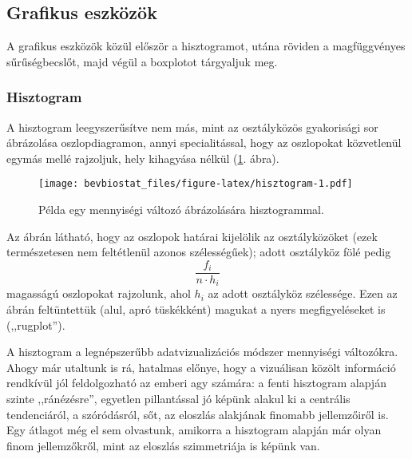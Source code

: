 \documentclass[]{book}
\newenvironment{Shaded}{\begin{snugshade}}{\end{snugshade}}
\newcommand{\KeywordTok}[1]{\textcolor[rgb]{0.13,0.29,0.53}{\textbf{#1}}}
\newcommand{\DataTypeTok}[1]{\textcolor[rgb]{0.13,0.29,0.53}{#1}}
\newcommand{\StringTok}[1]{\textcolor[rgb]{0.31,0.60,0.02}{#1}}
\newcommand{\OperatorTok}[1]{\textcolor[rgb]{0.81,0.36,0.00}{\textbf{#1}}}
\newcommand{\NormalTok}[1]{#1}
\begin{document}
\subsection{Grafikus eszközök}\label{deskriptivmennyegyvaltgrafikus}

A grafikus eszközök közül először a hisztogramot, utána röviden a
magfüggvényes sűrűségbecslőt, majd végül a boxplotot tárgyaljuk meg.

\subsubsection{Hisztogram}\label{deskriptivmennyegyvaltgrafikushisztogram}

A hisztogram leegyszerűsítve nem más, mint az osztályközös gyakorisági
sor ábrázolása oszlopdiagramon, annyi specialitással, hogy az oszlopokat
közvetlenül egymás mellé rajzoljuk, hely kihagyása nélkül
(\ref{fig:hisztogram}. ábra).

\begin{Shaded}
\end{Shaded}

\begin{figure}
\centering
\texttt{[image: bevbiostat\_files/figure-latex/hisztogram-1.pdf]}
\caption{\label{fig:hisztogram}Példa egy mennyiségi változó ábrázolására
hisztogrammal.}
\end{figure}

Az ábrán látható, hogy az oszlopok határai kijelölik az osztályközöket
(ezek természetesen nem feltétlenül azonos szélességűek); adott
osztályköz fölé pedig \[
    \frac{f_i}{n \cdot h_i}
\] magasságú oszlopokat rajzolunk, ahol \(h_i\) az adott osztályköz
szélessége. Ezen az ábrán feltüntettük (alul, apró tüskékként) magukat a
nyers megfigyeléseket is (,,rugplot'').

A hisztogram a legnépszerűbb adatvizualizációs módszer mennyiségi
változókra. Ahogy már utaltunk is rá, hatalmas előnye, hogy a vizuálisan
közölt információ rendkívül jól feldolgozható az emberi agy számára: a
fenti hisztogram alapján szinte ,,ránézésre'', egyetlen pillantással jó
képünk alakul ki a centrális tendenciáról, a szóródásról, sőt, az
eloszlás alakjának finomabb jellemzőiről is. Egy átlagot még el sem
olvastunk, amikorra a hisztogram alapján már olyan finom jellemzőkről,
mint az eloszlás szimmetriája is képünk van.
\end{document}
